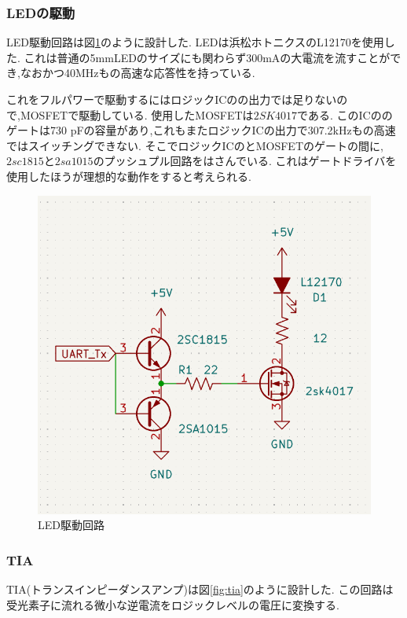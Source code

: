 \documentclass[a4paper,10pt]{article}
\begin{document}
\begin{multicols}{2}
\subsubsection{LEDの駆動}
LED駆動回路は図\ref{fig:led}のように設計した.
LEDは浜松ホトニクスのL12170を使用した.
これは普通の5mmLEDのサイズにも関わらず300mAの大電流を流すことができ,なおかつ40MHzもの高速な応答性を持っている.

これをフルパワーで駆動するにはロジックICのの出力では足りないので,MOSFETで駆動している.
使用したMOSFETは$2SK4017$である.
このICののゲートは730 pFの容量があり,これもまたロジックICの出力で307.2kHzもの高速ではスイッチングできない.
そこでロジックICのとMOSFETのゲートの間に,$2sc1815$と$2sa1015$のプッシュプル回路をはさんでいる.
これはゲートドライバを使用したほうが理想的な動作をすると考えられる.

\begin{figure}[H]
    \centering
    \includegraphics[width=\linewidth]{figure/led.png} 
    \caption{LED駆動回路} 
    \label{fig:led}
\end{figure}

\subsubsection{TIA}
TIA(トランスインピーダンスアンプ)は図\ref{fig:tia}のように設計した.
この回路は受光素子に流れる微小な逆電流をロジックレベルの電圧に変換する.


\end{multicols}
\end{document}
